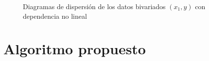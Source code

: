 \documentclass{article}
\begin{document}
\begin{figure}
\centering
{}
\label{fig:a}
\centering
{}
\label{fig:b}
\centering
\caption{Diagramas de dispersión de los datos bivariados $(x_1 , y)$ con dependencia no lineal}
\label{fig:3} 
\end{figure}
\section{Algoritmo propuesto}
\end{document}
